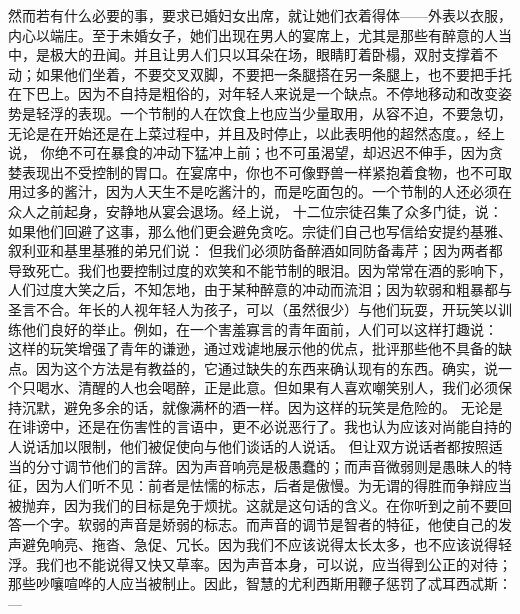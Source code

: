 然而若有什么必要的事，要求已婚妇女出席，就让她们衣着得体——外表以衣服，内心以端庄。至于未婚女子，她们出现在男人的宴席上，尤其是那些有醉意的人当中，是极大的丑闻。并且让男人们只以耳朵在场，眼睛盯着卧榻，双肘支撑着不动；如果他们坐着，不要交叉双脚，不要把一条腿搭在另一条腿上，也不要把手托在下巴上。因为不自持是粗俗的，对年轻人来说是一个缺点。不停地移动和改变姿势是轻浮的表现。一个节制的人在饮食上也应当少量取用，从容不迫，不要急切，无论是在开始还是在上菜过程中，并且及时停止，以此表明他的超然态度。，经上说，  你绝不可在暴食的冲动下猛冲上前；也不可虽渴望，却迟迟不伸手，因为贪婪表现出不受控制的胃口。在宴席中，你也不可像野兽一样紧抱着食物，也不可取用过多的酱汁，因为人天生不是吃酱汁的，而是吃面包的。一个节制的人还必须在众人之前起身，安静地从宴会退场。经上说，  十二位宗徒召集了众多门徒，说：  如果他们回避了这事，那么他们更会避免贪吃。宗徒们自己也写信给安提约基雅、叙利亚和基里基雅的弟兄们说： 但我们必须防备醉酒如同防备毒芹；因为两者都导致死亡。我们也要控制过度的欢笑和不能节制的眼泪。因为常常在酒的影响下，人们过度大笑之后，不知怎地，由于某种醉意的冲动而流泪；因为软弱和粗暴都与圣言不合。年长的人视年轻人为孩子，可以（虽然很少）与他们玩耍，开玩笑以训练他们良好的举止。例如，在一个害羞寡言的青年面前，人们可以这样打趣说： 这样的玩笑增强了青年的谦逊，通过戏谑地展示他的优点，批评那些他不具备的缺点。因为这个方法是有教益的，它通过缺失的东西来确认现有的东西。确实，说一个只喝水、清醒的人也会喝醉，正是此意。但如果有人喜欢嘲笑别人，我们必须保持沉默，避免多余的话，就像满杯的酒一样。因为这样的玩笑是危险的。    无论是在诽谤中，还是在伤害性的言语中，更不必说恶行了。我也认为应该对尚能自持的人说话加以限制，他们被促使向与他们谈话的人说话。 但让双方说话者都按照适当的分寸调节他们的言辞。因为声音响亮是极愚蠢的；而声音微弱则是愚昧人的特征，因为人们听不见：前者是怯懦的标志，后者是傲慢。为无谓的得胜而争辩应当被抛弃，因为我们的目标是免于烦扰。这就是这句话的含义。在你听到之前不要回答一个字。软弱的声音是娇弱的标志。而声音的调节是智者的特征，他使自己的发声避免响亮、拖沓、急促、冗长。因为我们不应该说得太长太多，也不应该说得轻浮。我们也不能说得又快又草率。因为声音本身，可以说，应当得到公正的对待；那些吵嚷喧哗的人应当被制止。因此，智慧的尤利西斯用鞭子惩罚了忒耳西忒斯：—\par

